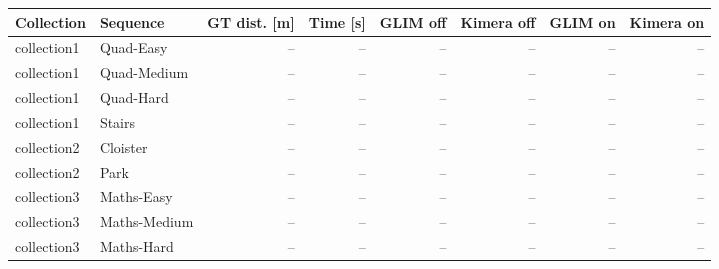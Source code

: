 \begin{tabular}{llrrrrrr}
\toprule
Collection & Sequence & GT dist. [m] & Time [s] & GLIM off & Kimera off & GLIM on & Kimera on \\
\midrule
collection1 & Quad-Easy & -- & -- & -- & -- & -- & -- \\
collection1 & Quad-Medium & -- & -- & -- & -- & -- & -- \\
collection1 & Quad-Hard & -- & -- & -- & -- & -- & -- \\
collection1 & Stairs & -- & -- & -- & -- & -- & -- \\
collection2 & Cloister & -- & -- & -- & -- & -- & -- \\
collection2 & Park & -- & -- & -- & -- & -- & -- \\
collection3 & Maths-Easy & -- & -- & -- & -- & -- & -- \\
collection3 & Maths-Medium & -- & -- & -- & -- & -- & -- \\
collection3 & Maths-Hard & -- & -- & -- & -- & -- & -- \\
\bottomrule
\end{tabular}
